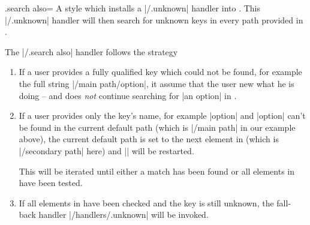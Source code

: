 \begin{handler}{{.search also}=}
  A style which installs a |/.unknown| handler into . This
  |/.unknown| handler will then search for unknown keys in every path
  provided in . 

\begin{codeexample}[]


\end{codeexample}

  The |/.search also| handler follows the strategy
  \begin{enumerate}
  \item If a user provides a fully qualified key which could not be
    found, for example the full string |/main path/option|, it assume
    that the user new what he is doing -- and does \emph{not} continue
    searching for |an option| in . 
  \item If a user provides only the key's name, for example |option|
    and |option| can't be found in the current default path (which is
    |/main path| in our example above), the current default path is
    set to the next element in  (which is
    |/secondary path| here) and |\pgfkeys| will be restarted. 
    
    This will be iterated until either a match has been found or all
    elements in  have been tested. 

  \item If all elements in  have been checked and the
    key is still unknown, the fall-back handler |/handlers/.unknown|
    will be invoked. 
  \end{enumerate}
\begin{codeexample}[]



%
\end{codeexample}


\end{handler}
